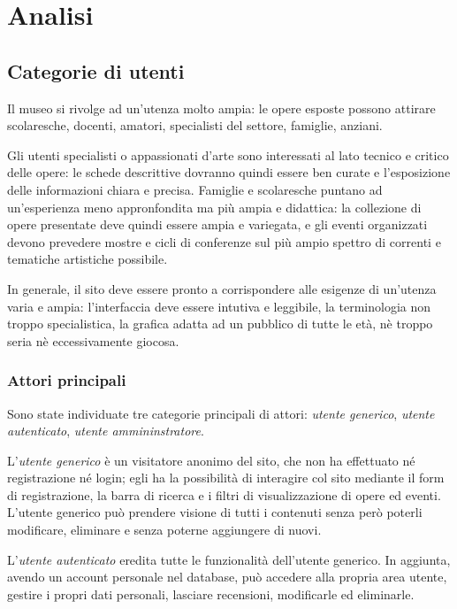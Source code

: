 \section{Analisi}
\label{analisi}

\subsection{Categorie di utenti}
\label{analisi-categorie-utenti}
Il museo si rivolge ad un'utenza molto ampia: le opere esposte possono attirare scolaresche, docenti, amatori, specialisti del settore, famiglie, anziani.

Gli utenti specialisti o appassionati d'arte sono interessati al lato tecnico e critico delle opere: le schede descrittive dovranno quindi essere ben curate e l'esposizione delle informazioni chiara e precisa. Famiglie e scolaresche puntano ad un'esperienza meno appronfondita ma più ampia e didattica: la collezione di opere presentate deve quindi essere ampia e variegata, e gli eventi organizzati devono prevedere mostre e cicli di conferenze sul più ampio spettro di correnti e tematiche artistiche possibile.

In generale, il sito deve essere pronto a corrispondere alle esigenze di un'utenza varia e ampia: l'interfaccia deve essere intutiva e leggibile, la terminologia non troppo specialistica, la grafica adatta ad un pubblico di tutte le età, nè troppo seria nè eccessivamente giocosa.

\subsubsection{Attori principali}
\label{analisi-casi-uso-attori-principali}
Sono state individuate tre categorie principali di attori: \textit{utente generico}, \textit{utente autenticato}, \textit{utente ammininstratore}.

L'\textit{utente generico} è un visitatore anonimo del sito, che non ha effettuato né registrazione né login; egli ha la possibilità di interagire col sito mediante il form di registrazione, la barra di ricerca e i filtri di visualizzazione di opere ed eventi. L'utente generico può prendere visione di tutti i contenuti senza però poterli modificare, eliminare e senza poterne aggiungere di nuovi.

L'\textit{utente autenticato} eredita tutte le funzionalità dell'utente generico. In aggiunta, avendo un account personale nel database, può accedere alla propria area utente, gestire i propri dati personali, lasciare recensioni, modificarle ed eliminarle.

